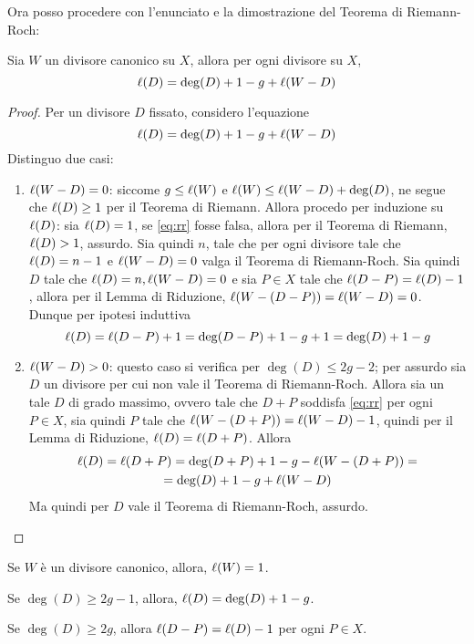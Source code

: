     Ora posso procedere con l'enunciato e la dimostrazione del Teorema di Riemann-Roch:
    \begin{teorema}
        Sia $W$ un divisore canonico su $X$, allora per ogni divisore su $X$, $$\ell(D) = \deg(D) + 1 - g + \ell(W - D)$$
    \end{teorema}
    \begin{proof}
        Per un divisore $D$ fissato, considero l'equazione \begin{equation}\label{eq:rr}
            \ell(D) = \deg(D) + 1 - g + \ell(W - D)
        \end{equation}
        Distinguo due casi: \begin{enumerate}
            \item $\ell(W - D) = 0$: siccome $g \leq \ell(W)$ e $\ell(W) \leq \ell(W-D) + \deg(D)$, ne segue che $\ell(D) \geq 1$ per il Teorema di Riemann. Allora procedo per induzione su $\ell(D)$:
            sia $\ell(D) = 1$, se \ref{eq:rr} fosse falsa, allora per il Teorema di Riemann, $\ell(D) > 1$, assurdo. Sia quindi $n$, tale che per ogni divisore tale che $\ell(D) = n-1$ e $\ell(W-D) = 0$ 
            valga il Teorema di Riemann-Roch. Sia quindi $D$ tale che $\ell(D) = n, \ell(W-D) = 0$ e sia $P \in X$ tale che $\ell(D-P) = \ell(D) - 1$, allora per il Lemma di Riduzione, $\ell(W-(D-P)) = \ell(W-D) = 0$. 
            Dunque per ipotesi induttiva \begin{equation*}
                \ell(D) = \ell(D-P) + 1 = \deg(D-P) + 1 - g + 1 = \deg(D) + 1 - g
            \end{equation*}
            \item $\ell(W-D) > 0$: questo caso si verifica per $\deg(D) \leq 2g -2$; per assurdo sia $D$ un divisore per cui non vale il Teorema di Riemann-Roch. Allora sia un tale $D$ di grado massimo, ovvero tale che 
            $D + P$ soddisfa \ref{eq:rr} per ogni $P \in X$, sia quindi $P$ tale che $\ell(W-(D+P)) = \ell(W-D)-1$, quindi per il Lemma di Riduzione, $\ell(D) = \ell(D+P)$. Allora \begin{multline*}
                \ell(D) = \ell(D+P) = \deg(D+P) + 1 - g - \ell(W-(D+P)) = \\ = \deg(D) + 1 - g + \ell(W-D) 
            \end{multline*}
            Ma quindi per $D$ vale il Teorema di Riemann-Roch, assurdo.
        \end{enumerate}
    \end{proof}
    \begin{corollario}
        Se $W$ è un divisore canonico, allora, $\ell(W) = 1$.
    \end{corollario}
    \begin{corollario}
        Se $\deg(D) \geq 2g-1$, allora, $\ell(D) = \deg(D)+1-g$.
    \end{corollario}
    \begin{corollario}
        Se $\deg(D) \geq 2g$, allora $\ell(D-P) = \ell(D)-1$ per ogni $P \in X$.
    \end{corollario}